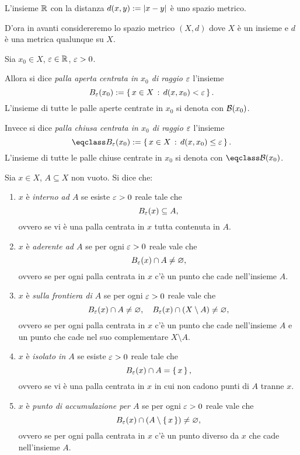 \begin{remark}
    L'insieme $\R$ con la distanza $d(x, y) \deq \abs*{x - y}$ è uno spazio metrico.
\end{remark}

D'ora in avanti considereremo lo spazio metrico $(X, d)$ dove $X$ è un insieme e $d$ è una metrica qualunque su $X$.

\begin{definition}
     \label{def:palla_aperta_chiusa}
    Sia $x_0 \in X$, $\eps \in \R$, $\eps > 0$.

    Allora si dice \emph{palla aperta centrata in $x_0$ di raggio $\eps$} l'insieme \[
        \oB{x_0} \deq \set{x \in X \suchthat d(x, x_0) < \eps}.   
    \] L'insieme di tutte le palle aperte centrate in $x_0$ si denota con $\BB(x_0)$.

    Invece si dice \emph{palla chiusa centrata in $x_0$ di raggio $\eps$} l'insieme \[
        \cB{x_0} \deq \set{x \in X \suchthat d(x, x_0) \leq \eps}.   
    \] L'insieme di tutte le palle chiuse centrate in $x_0$ si denota con $\closure{\BB}(x_0)$.
\end{definition}

\begin{definition}
     \label{def:caratt_punti}
    Sia $x \in X$, $A \subseteq X$ non vuoto. Si dice che:
    \begin{enumerate}
        \item $x$ è \emph{interno ad $A$} se esiste $\eps > 0$ reale tale che \[
                \oB{x} \subseteq A, 
        \] ovvero se vi è una palla centrata in $x$ tutta contenuta in $A$.
        \item $x$ è \emph{aderente ad $A$} se per ogni $\eps > 0$ reale vale che \[
            \oB{x} \inters A \neq \varnothing,
        \] ovvero se per ogni palla centrata in $x$ c'è un punto che cade nell'insieme $A$.
        \item $x$ è \emph{sulla frontiera di $A$} se per ogni $\eps > 0$ reale vale che \[
            \oB{x} \inters A \neq \varnothing, \quad \oB{x} \inters (X \setminus A) \neq \varnothing, 
        \] ovvero se per ogni palla centrata in $x$ c'è un punto che cade nell'insieme $A$ e un punto che cade nel suo complementare $X \setminus A$.
        \item $x$ è \emph{isolato in $A$} se esiste $\eps > 0$ reale tale che \[
                \oB{x} \inters A = \set{x}, 
        \] ovvero se vi è una palla centrata in $x$ in cui non cadono punti di $A$ tranne $x$.
        \item $x$ è \emph{punto di accumulazione per $A$} se per ogni $\eps > 0$ reale vale che \[
            \oB{x} \inters (A \setminus \set{x}) \neq \varnothing,
        \] ovvero se per ogni palla centrata in $x$ c'è un punto diverso da $x$ che cade nell'insieme $A$.
    \end{enumerate}
\end{definition}

